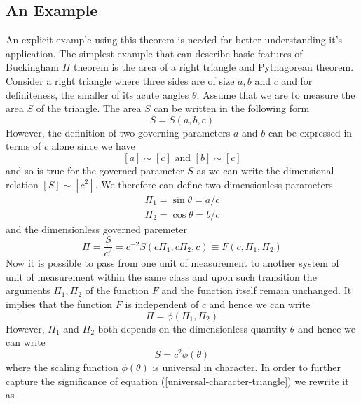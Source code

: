 	\subsection{An Example}
	An explicit example using this theorem is needed for better understanding it's application. The simplest example that can describe basic features of Buckingham $\Pi$ theorem is the area of a right triangle and Pythagorean theorem. \\
	Consider a right triangle where three sides are of size $a,b$ and $c$ and for definiteness, the smaller of its acute angles $\theta$. Assume that we are to measure the area $S$ of the triangle. The area $S$ can be written in the following form
	\begin{equation}
		S=S(a,b,c)
	\end{equation}
	However, the definition of two governing parameters $a$ and $b$ can be expressed in terms of $c$ alone since we have
	\begin{equation}
		\left[a\right] \sim \left[c\right] \text{ and } 
		\left[b\right] \sim \left[c\right]
	\end{equation}
	and so is true for the governed parameter $S$ as we can write the dimensional relation $\left[S\right] \sim \left[c^2\right]$. We therefore can define two dimensionless parameters
	\begin{align}
		\Pi_1 = \sin \theta = a/c \\
		\Pi_2 = \cos \theta = b/c
	\end{align}
	and the dimensionless governed paremeter
	\begin{equation}
		\Pi = \frac{S}{c^2} = c^{-2} S(c\Pi_1, c\Pi_2,c) \equiv F(c, \Pi_1, \Pi_2)
	\end{equation}
	Now it is possible to pass from one unit of measurement to another system of unit of measurement within the same class and upon such transition the arguments $\Pi_1, \Pi_2$ of the function $F$ and the function itself remain unchanged. It implies that the function $F$ is independent of $c$ and hence we can write
	\begin{equation}
		\Pi = \phi(\Pi_1, \Pi_2)
	\end{equation}
	However, $\Pi_1$ and $\Pi_2$ both depends on the dimensionless quantity $\theta$ and hence we can write 
	\begin{equation}
		S = c^2 \phi(\theta)
		\label{universal-character-triangle}
	\end{equation}
	where the scaling function $\phi(\theta)$ is universal in character. In order to further capture the significance of equation (\ref{universal-character-triangle}) we rewrite it as
